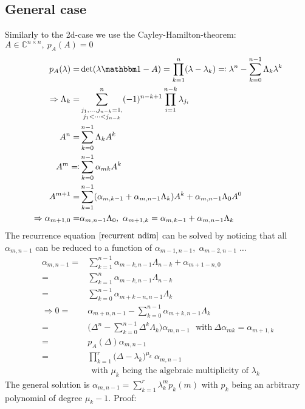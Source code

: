 \documentclass[12pt]{article}
\begin{document}
\subsection{General case}\label{ch:math.general case}
Similarly to the 2d-case we use the Cayley-Hamilton-theorem: $A \in \mathbb C^{n\times n},\ p_A(A) = 0$
\begin{align}
p_A(\lambda) =& \det(\lambda\mathbbm 1 - A) = \prod_{k=1}^n(\lambda - \lambda_k) \eqqcolon \lambda^n - \sum_{k=0}^{n-1} \Lambda_k \lambda^k\nonumber\\
\Rightarrow \Lambda_k =& \sum_{\substack{j_1,\dots,j_{n-k} = 1,\\ j_1<\dots<j_{n-k}}}^n (-1)^{n-k+1} \prod_{i=1}^{n-k} \lambda_{j_i} \\
A^n =& \sum_{k=0}^{n-1} \Lambda_k A^k\nonumber\\
A^m \eqqcolon& \sum_{k=0}^{n-1} \alpha_{mk} A^k\\
A^{m+1} =& \sum_{k=1}^{n-1} (\alpha_{m,k-1} + \alpha_{m,n-1}\Lambda_k) A^k + \alpha_{m,n-1}\Lambda_0 A^0 \nonumber\\
\Rightarrow \alpha_{m+1,0} =& \alpha_{m,n-1} \Lambda_0,\ \alpha_{m+1,k} = \alpha_{m,k-1} + \alpha_{m,n-1}\Lambda_k \label{recurrent ndim}
\end{align}
The recurrence equation $\eqref{recurrent ndim}$ can be solved by noticing that all $\alpha_{m,n-1}$ can be reduced to a function of $\alpha_{m-1,n-1},\; \alpha_{m-2,n-1}\; \dots$
\begin{align}
\alpha_{m,n-1} =& \sum_{k=1}^{n-1} \alpha_{m-k,n-1}\Lambda_{n-k} + \alpha_{m+1-n,0} \nonumber\\
=& \sum_{k=1}^n \alpha_{m-k,n-1}\Lambda_{n-k} \nonumber\\
=& \sum_{k=0}^{n-1} \alpha_{m+k-n,n-1}\Lambda_k \nonumber\\
\Rightarrow 0=& \alpha_{m+n,n-1} - \sum_{k=0}^{n-1} \alpha_{m+k,n-1}\Lambda_k \nonumber\\
=& \big( \Delta^n - \sum_{k=0}^{n-1} \Delta^k \Lambda_k \big) \alpha_{m, n-1} \ \ \ \text{with}\ \Delta \alpha_{mk} = \alpha_{m+1,k}\nonumber\\
=& p_A(\Delta) \alpha_{m, n-1}\nonumber\\
=& \prod_{k=1}^r\big( \Delta - \lambda_k \big)^{\mu_k}\ \alpha_{m, n-1}\\
&\ \ \text{with $\mu_k$ being the algebraic multiplicity of $\lambda_k$}\nonumber
\end{align}
The general solution is $\alpha_{m, n-1} = \sum_{k=1}^r \lambda_k^m p_k(m)$ with $p_k$ being an arbitrary polynomial of degree $\mu_k-1$. Proof:
\end{document}
